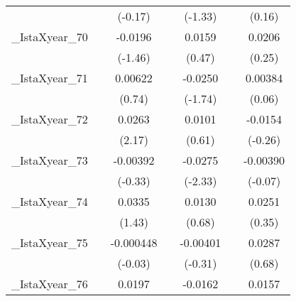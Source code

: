 {\begin{tabular}{l*{6}{c}}
            &                     &     (-0.17)         &                     &     (-1.33)         &                     &      (0.16)         \\
[1em]
\_IstaXyear\_70&                     &     -0.0196         &                     &      0.0159         &                     &      0.0206         \\
            &                     &     (-1.46)         &                     &      (0.47)         &                     &      (0.25)         \\
[1em]
\_IstaXyear\_71&                     &     0.00622         &                     &     -0.0250         &                     &     0.00384         \\
            &                     &      (0.74)         &                     &     (-1.74)         &                     &      (0.06)         \\
[1em]
\_IstaXyear\_72&                     &      0.0263\sym{*}  &                     &      0.0101         &                     &     -0.0154         \\
            &                     &      (2.17)         &                     &      (0.61)         &                     &     (-0.26)         \\
[1em]
\_IstaXyear\_73&                     &    -0.00392         &                     &     -0.0275\sym{*}  &                     &    -0.00390         \\
            &                     &     (-0.33)         &                     &     (-2.33)         &                     &     (-0.07)         \\
[1em]
\_IstaXyear\_74&                     &      0.0335         &                     &      0.0130         &                     &      0.0251         \\
            &                     &      (1.43)         &                     &      (0.68)         &                     &      (0.35)         \\
[1em]
\_IstaXyear\_75&                     &   -0.000448         &                     &    -0.00401         &                     &      0.0287         \\
            &                     &     (-0.03)         &                     &     (-0.31)         &                     &      (0.68)         \\
[1em]
\_IstaXyear\_76&                     &      0.0197         &                     &     -0.0162         &                     &      0.0157         \\

\end{tabular}}
